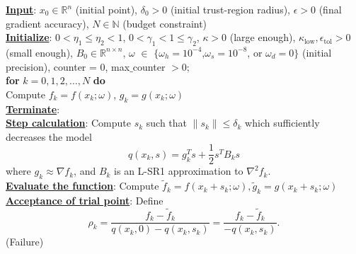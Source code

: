 \documentclass[12pt]{article}
\theoremstyle{definition}
\newcommand{\Rn}{\mathbb{R}^{n}}
\newcommand{\R}{\mathbb{R}}
\newcommand{\N}{\mathbb{N}}
\begin{document}
\begin{algorithm}[t!]
     		\underline{ \textbf{Input}}: $x_{0} \in \Rn$ (initial point), $\delta_{0}>0$ (initial trust-region radius), $\epsilon>0$ (final gradient accuracy), $N \in \N$ (budget constraint)\\
     		\underline{\textbf{Initialize}}: $0<\eta_1\leq \eta_2<1$, $0<\gamma_1<1\leq \gamma_2$, $\kappa >0$ (large enough), $\kappa_{\text{low}},\epsilon_{\text{tol}} >0$ (small enough), $B_{0} \in \R^{n \times n}$, $\omega$ $\in$ $\{\omega_{h}=10^{-4}$,$\omega_{s}=10^{-8}$, or $\omega_{d}=0\}$ (initial precision), counter = $0$, max$\_$counter $>0$; \\
     		\textbf{for} $k =0,1,2,\dots, N$ \textbf{do} \\
     	     Compute $f_k=f(x_k;\omega)$, $g_k=g(x_k;\omega)$\\
     	     \underline{ \textbf{Terminate}}: \\
     	    \underline{\textbf{Step calculation}}: Compute $s_{k}$ such that $\|s_{k}\| \leq \delta_{k}$ which sufficiently decreases the model
     	     \begin{equation*}
     	      q(x_k,s) = g_{k}^{T}s + \dfrac{1}{2}s^{T}B_{k}s
     	     	\end{equation*}
     	     	where $g_{k} \approx \nabla f_{k}$, and $B_k$ is an L-SR1 approximation to $\nabla^{2}f_{k}$.\\
     	    \underline{\textbf{Evaluate the function}}: Compute $\tilde{f}_{k}= f(x_{k}+s_{k};\omega), \tilde{g}_{k}= g(x_{k}+s_{k};\omega)$ \\
     	    \underline{\textbf{Acceptance of trial point}}: Define 
     	    \begin{equation*}
     	    \rho_{k} = \dfrac{f_{k} -\tilde{f}_{k}}{q(x_k,0)-q(x_k,s_{k})} = \dfrac{f_{k}- \tilde{f}_{k}}{-q(x_k,s_{k})} .
     	    \end{equation*}
           (Failure) 
\end{algorithm}
\end{document}
